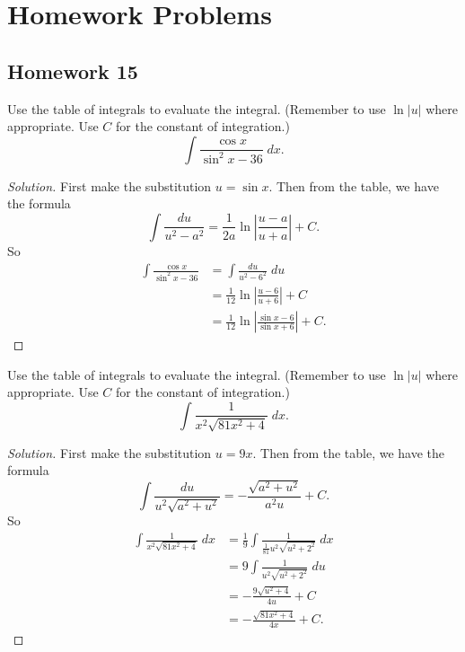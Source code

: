 \chapter{Homework Problems}
\section{Homework 15}
\begin{problem}[WebAssign, HW 15, \# 1]
Use the table of integrals to evaluate the integral. (Remember to use
$\ln|u|$ where appropriate. Use $C$ for the constant of integration.)
\[
\int\frac{\cos x}{\sin^2x-36}\;dx.
\]
\end{problem}
\begin{proof}[Solution]
First make the substitution $u=\sin x$. Then from the table, we have the
formula
\begin{equation}
\label{eq:table-formula-20}
\int\frac{du}{u^2-a^2}=\frac{1}{2a}\ln\left|\frac{u-a}{u+a}\right|+C.
\end{equation}
So
\begin{align*}
\int\frac{\cos x}{\sin^2x-36}
&=\int\frac{du}{u^2-6^2}\;du\\
&=\frac{1}{12}\ln\left|\frac{u-6}{u+6}\right|+C\\
&=\boxed{\frac{1}{12}\ln\left|\frac{\sin x-6}{\sin x+6}\right|+C.}
\end{align*}
\end{proof}

\begin{problem}[WebAssign, HW 15, \# 2]
Use the table of integrals to evaluate the integral. (Remember to use
$\ln|u|$ where appropriate. Use $C$ for the constant of integration.)
\[
\int\frac{1}{x^2\sqrt{81x^2+4}}\;dx.
\]
\end{problem}
\begin{proof}[Solution]
First make the substitution $u=9x$. Then from the table, we have the formula
\begin{equation}
  \label{eq:table-formula-28}
\int\frac{du}{u^2\sqrt{a^2+u^2}}=-\frac{\sqrt{a^2+u^2}}{a^2u}+C.
\end{equation}
So
\begin{align*}
\int\frac{1}{x^2\sqrt{81x^2+4}}\;dx
&=\frac{1}{9}\int\frac{1}{\frac{1}{81}u^2\sqrt{u^2+2^2}}\;dx\\
&=9\int\frac{1}{u^2\sqrt{u^2+2^2}}\;du\\
&=-\frac{9\sqrt{u^2+4}}{4u}+C\\
&=\boxed{-\frac{\sqrt{81x^2+4}}{4x}+C.}
\end{align*}
\end{proof}

